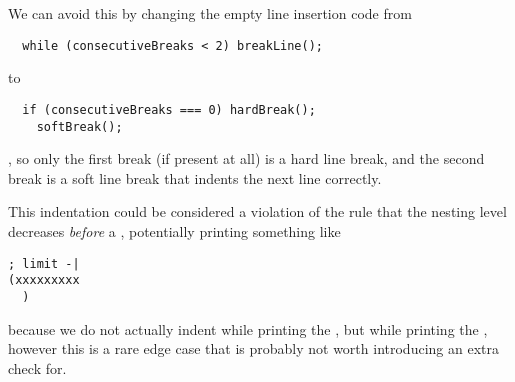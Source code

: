 We can avoid this by changing the
empty line insertion code from
\begin{verbatim}
  while (consecutiveBreaks < 2) breakLine();
\end{verbatim}
to
\begin{verbatim}
  if (consecutiveBreaks === 0) hardBreak();
    softBreak();
\end{verbatim}
, so only the first break (if present at all) is a hard line break,
and the second break is a soft line break
that indents the next line correctly.

This indentation could be considered a violation of
the rule that the nesting level decreases \textit{before}
a , potentially printing something like
\begin{verbatim}
; limit -|
(xxxxxxxxx
  )
\end{verbatim}
because we do not actually indent while printing the ,
but while printing the ,
however this is a rare edge case
that is probably not worth introducing an extra check for.
